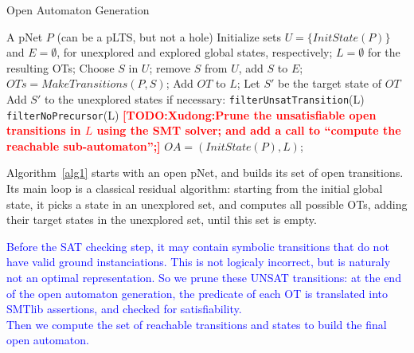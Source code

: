 \documentclass[smallcondensed]{svjour3}
\newcommand{\noteSB}[2][color=green!40, size=\tiny]{\todo[#1]{{\bf
      Note: } {#2}}}
\newcommand{\noteEM}[2][color=blue!40, size=\tiny]{\todo[#1]{{\bf Eric: } {#2}}}
\newcommand{\TODO}[1]{\textcolor{red}{\textbf{[TODO:#1]}}}
\newcommand{\ERIC}[1]{\textcolor{blue}{#1}}
\newcommand{\QIN}[1]{\textcolor{airforceblue}{#1}}
\newcommand{\ie}[1][\ ]{i.e.#1}
\begin{document}

\begin{algorithm}[h]
  \caption{Open Automaton Generation}
  \label{alg1}
\begin{algorithmic}[1]
\Require A pNet $P$ (can be a pLTS, but not a hole)
\State Initialize sets $U=\{\mathit{InitState}(P)\}$ and $E=\emptyset$,
for unexplored and explored global states, respectively; $L=\emptyset$ for the resulting OTs;
	\State Choose $S$ in $U$; remove $S$ from $U$, add $S$ to $E$;
	\State $\mathit{OTs} = \mathit{MakeTransitions}(P, S)$;
          \State Add $\mathit{OT}$ to $L$;
          \State Let $S'$ be the target state of $\mathit{OT}$
          Add $S'$ to the unexplored states if necessary:
	  \EndFor
\EndWhile
\State \QIN{\texttt{filterUnsatTransition}(L)}
\State \QIN{\texttt{filterNoPrecursor}(L)}
\State \TODO{Xudong:Prune the unsatisfiable open transitions in $L$ using the SMT
  solver;
   and add a call to ``compute the reachable sub-automaton'';}
\State \Return $\mathit{OA}=(\mathit{InitState}(P),L)$;

\end{algorithmic}  
\end{algorithm}

Algorithm~\ref{alg1} starts with an open pNet, and builds its set of open
transitions. Its main loop is a classical residual algorithm: starting
from the initial global state, it picks a state in an unexplored set, and
computes all possible OTs, adding their target states in the
unexplored set, until this set is empty.

\ERIC{Before the SAT checking step, it may contain symbolic transitions that
do not have valid ground instanciations. This is not logicaly
incorrect, but is naturaly not an optimal representation. So we prune
these UNSAT transitions: at the end of the open automaton generation,
the predicate of each OT is translated 
into SMTlib assertions, and checked for satisfiability.\\
Then we compute the set of reachable transitions and states to build
the final open automaton.}
\end{document}
